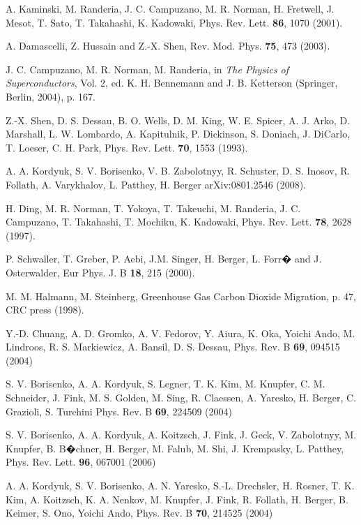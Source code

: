 \documentclass[aps,twocolumn,amsmath,amssymb,showpacs,prb,
superscriptaddress,unsortedaddress]{revtex4}
\begin{document}
\begin{thebibliography}{99}
A. Kaminski, M. Randeria, J. C. Campuzano, M. R. Norman, H. Fretwell,
J. Mesot, T. Sato, T. Takahashi, K. Kadowaki, Phys. Rev. Lett.
{\bf86}, 1070 (2001).

A. Damascelli, Z. Hussain and Z.-X. Shen, Rev. Mod. Phys. {\bf75}, 473
(2003).

J. C. Campuzano, M. R. Norman, M. Randeria, in {\it The Physics of
Superconductors}, Vol. 2, ed. K. H. Bennemann and J. B. Ketterson
(Springer, Berlin, 2004), p. 167.

Z.-X. Shen, D. S. Dessau, B. O. Wells, D. M. King, W. E. Spicer, A. J.
Arko, D. Marshall, L. W. Lombardo, A. Kapitulnik, P. Dickinson, S.
Doniach, J. DiCarlo, T. Loeser, C. H. Park, Phys. Rev. Lett. {\bf70},
1553 (1993).

A. A. Kordyuk, S. V. Borisenko, V. B. Zabolotnyy, R. Schuster, D. S.
Inosov, R. Follath, A. Varykhalov, L. Patthey, H. Berger
arXiv:0801.2546 (2008).

H. Ding, M. R. Norman, T. Yokoya, T. Takeuchi, M. Randeria, J. C.
Campuzano, T. Takahashi, T. Mochiku, K. Kadowaki, Phys. Rev. Lett.
{\bf78}, 2628 (1997).

P. Schwaller, T. Greber, P. Aebi, J.M. Singer, H. Berger, L. Forr� and
J. Osterwalder, Eur Phys. J. B {\bf18}, 215 (2000).

M. M. Halmann, M. Steinberg, Greenhouse Gas Carbon Dioxide Migration,
p. 47,  CRC press (1998).

Y.-D. Chuang, A. D. Gromko, A. V. Fedorov, Y. Aiura, K. Oka, Yoichi
Ando, M. Lindroos, R. S. Markiewicz, A. Bansil, D. S. Dessau, Phys.
Rev. B {\bf69}, 094515 (2004)

S. V. Borisenko, A. A. Kordyuk, S. Legner, T. K. Kim, M. Knupfer, C.
M. Schneider, J. Fink, M. S. Golden, M. Sing, R. Claessen, A. Yaresko,
H. Berger, C. Grazioli, S. Turchini Phys. Rev. B {\bf69}, 224509
(2004)

S. V. Borisenko, A. A. Kordyuk, A. Koitzsch, J. Fink, J. Geck, V.
Zabolotnyy, M. Knupfer, B. B�chner, H. Berger, M. Falub, M. Shi, J.
Krempasky, L. Patthey, Phys. Rev. Lett. {\bf96}, 067001 (2006)

A. A. Kordyuk, S. V. Borisenko, A. N. Yaresko, S.-L. Drechsler, H.
Rosner, T. K. Kim, A. Koitzsch, K. A. Nenkov, M. Knupfer, J. Fink, R.
Follath, H. Berger, B. Keimer, S. Ono, Yoichi Ando, Phys. Rev. B
{\bf70}, 214525 (2004)


\end{thebibliography}
\end{document}
